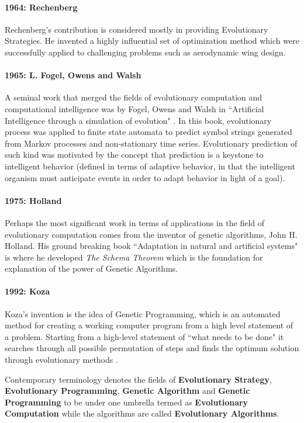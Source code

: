 \paragraph{1964: Rechenberg}
Rechenberg's contribution is considered mostly in providing Evolutionary Strategies. He invented a highly influential set of optimization method which were successfully applied to challenging problems such as aerodynamic wing design. \cite{rechenberg1973}

\paragraph{1965: L. Fogel, Owens and Walsh}
A seminal work that merged the fields of evolutionary computation and computational intelligence was by Fogel, Owens and Walsh in ``Artificial Intelligence through a simulation of evolution" \cite{fogel1966}. In this book, evolutionary process was applied to finite state automata to predict symbol strings generated from Markov processes and non-stationary time series. Evolutionary prediction of such kind was motivated by the concept that prediction is a keystone to intelligent behavior (defined in terms of adaptive behavior, in that the intelligent organism must anticipate events in order to adapt behavior in light of a goal). 

\paragraph{1975: Holland}
Perhaps the most significant work in terms of applications in the field of evolutionary computation comes from the inventor of genetic algorithms, John H. Holland. His ground breaking book ``Adaptation in natural and artificial systems" \cite{holland1975} is where he developed \textit{The Schema Theorem} which is the foundation for explanation of the power of Genetic Algorithms.

\paragraph{1992: Koza}
Koza's invention is the idea of Genetic Programming, which is an automated method for creating a working computer program from a high level statement of a problem. Starting from a high-level statement of ``what needs to be done" it searches through all possible permutation of steps and finds the optimum solution through evolutionary methods \cite{koza1992}.

Contemporary terminology denotes the fields of \textbf{Evolutionary Strategy}, \textbf{Evolutionary Programming}, \textbf{Genetic Algorithm} and \textbf{Genetic Programming} to be under one umbrella termed as \textbf{Evolutionary Computation} while the algorithms are called \textbf{Evolutionary Algorithms}.

